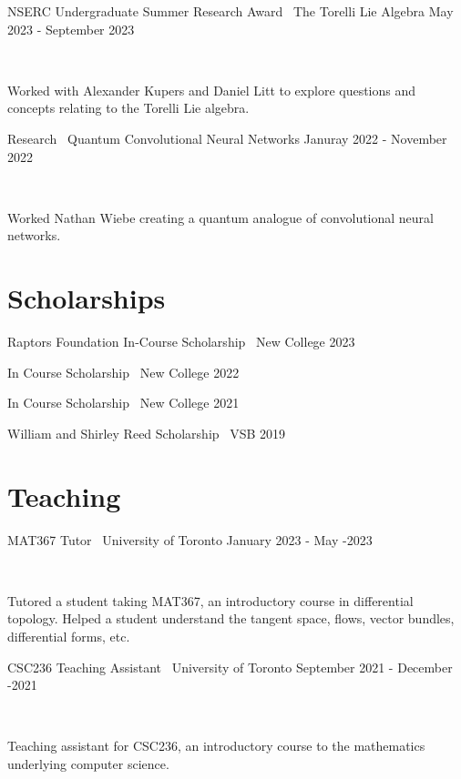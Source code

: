 \documentclass[]{style}
\begin{document}
\begin{entrylist}

\vspace{1mm}

\entry
{NSERC Undergraduate Summer Research Award \ {\normalfont The Torelli Lie Algebra}}
{May 2023 - September 2023}
{ ~ \vspace{-3.5mm}

Worked with Alexander Kupers and Daniel Litt to explore questions and concepts relating to the Torelli Lie algebra.}

\entry
{Research \ {\normalfont Quantum Convolutional Neural Networks}}
{Januray 2022 - November 2022}
{ ~ \vspace{-3.5mm}

Worked Nathan Wiebe creating a quantum analogue of convolutional neural networks.}

\end{entrylist}

\section{Scholarships}

\begin{entrylist}

\vspace{-3mm}
\entry
{Raptors Foundation In-Course Scholarship \ {\normalfont New College}}
{2023}
{}

\vspace{-3mm}
\entry
{In Course Scholarship \ {\normalfont New College}}
{2022}
{}

\vspace{-3mm}
\entry
{In Course Scholarship \ {\normalfont New College}}
{2021}
{}

\vspace{-3mm}
\entry
{William and Shirley Reed Scholarship \ {\normalfont VSB}}
{2019}
{}

\end{entrylist}

\section{Teaching}

\begin{entrylist}

\vspace{1mm}

\entry
{MAT367 Tutor \ {\normalfont University of Toronto}}
{January 2023 - May -2023}
{ ~ \vspace{-2.5mm}

Tutored a student taking MAT367, an introductory course in differential topology. Helped a student understand the tangent space, flows, vector bundles, differential forms, etc.  
}

\entry
{CSC236 Teaching Assistant \ {\normalfont University of Toronto}}
{September 2021 - December -2021}
{ ~ \vspace{-2.5mm}

Teaching assistant for CSC236, an introductory course to the mathematics underlying computer science.
}


\end{entrylist}
\end{document}
